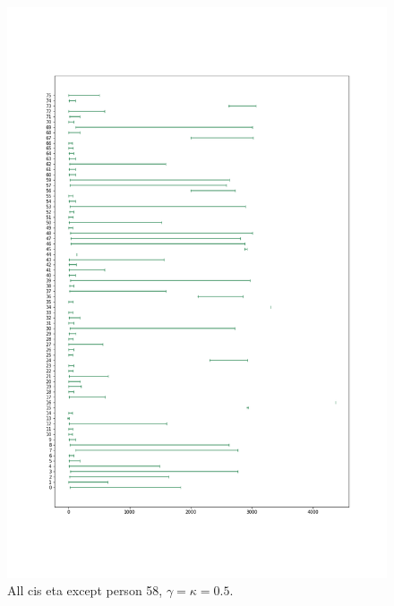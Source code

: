 \begin{figure}
    \centering
    \includegraphics[scale=0.38]{pictures/Gamma=kappa=0.5/all_cis_eta_unlim.png}
    \caption{All cis eta except person 58, $\gamma=\kappa=0.5$.}
    \label{fig:gk0.5_all_cis_eta_unlim}
\end{figure}




